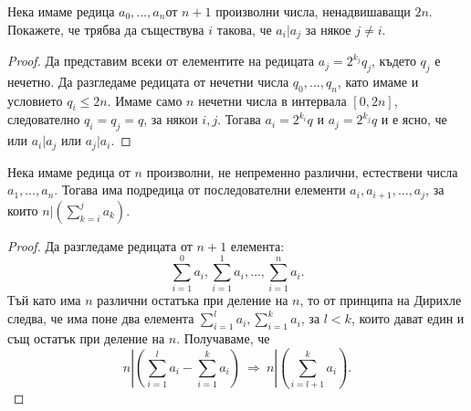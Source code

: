 \begin{problem}%
  Нека имаме редица $a_0,\dots,a_n$от $n+1$ произволни числа, ненадвишаващи $2n$.
  Покажете, че трябва да съществува $i$ такова, че $a_i\vert a_j$ за някое $j\neq i$.
\end{problem}
\begin{proof}
  Да представим всеки от елементите на редицата $a_j = 2^{k_j}q_j$, където $q_j$ е нечетно.
  Да разгледаме редицата от нечетни числа $q_0,\dots,q_n$, като имаме и условието $q_i \leq 2n$.
  Имаме само $n$ нечетни числа в интервала $[0,2n]$, следователно $q_i = q_j = q$, за някои $i,j$.
  Тогава $a_i = 2^{k_i}q$ и $a_j = 2^{k_j}q$ и е ясно, че или $a_i\vert a_j$ или $a_j\vert a_i$.  
\end{proof}



\begin{problem}
  Нека имаме редица от $n$ произволни, не непременно различни, естествени числа $a_1,\dots,a_n$.
  Тогава има подредица от последователни елементи $a_i,a_{i+1},\dots,a_{j}$, за които
  $n | (\sum^{j}_{k=i}a_k)$.
\end{problem}
\begin{proof}
  Да разгледаме редицата от $n+1$ елемента:
  \[\sum^0_{i=1}a_i,\sum^1_{i=1}a_i,\dots,\sum^n_{i=1}a_i.\]
  Тъй като има $n$ различни остатъка при деление на $n$, то от принципа на Дирихле следва, че 
  има поне два елемента $\sum^l_{i=1}a_i, \sum^k_{i=1}a_i$, за $l<k$, които дават един и същ остатък при деление на $n$.
  Получаваме, че \[n|(\sum^l_{i=1}a_i - \sum^k_{i=1}a_i)\ \Rightarrow\ n|(\sum^k_{i=l+1}a_i).\]
\end{proof}


